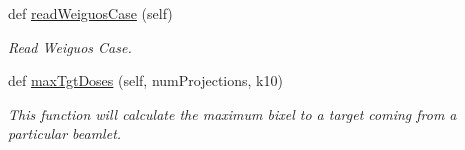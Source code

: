 \begin{DoxyCompactItemize}
\mbox{\label{classmultiTool_1_1tomodata_aa5f4559675dc261494a0036aab654d0a}} 
def \mbox{\hyperlink{classmultiTool_1_1tomodata_aa5f4559675dc261494a0036aab654d0a}{read\+Weiguos\+Case}} (self)
\begin{DoxyCompactList}\small\item\em Read Weiguo\textquotesingle{}s Case. \end{DoxyCompactList}\item 
\mbox{\label{classmultiTool_1_1tomodata_a9f2a7d3968b3633bda92aa460556be6a}} 
def \mbox{\hyperlink{classmultiTool_1_1tomodata_a9f2a7d3968b3633bda92aa460556be6a}{max\+Tgt\+Doses}} (self, num\+Projections, k10)
\begin{DoxyCompactList}\small\item\em This function will calculate the maximum bixel to a target coming from a particular beamlet. \end{DoxyCompactList}\end{DoxyCompactItemize}
